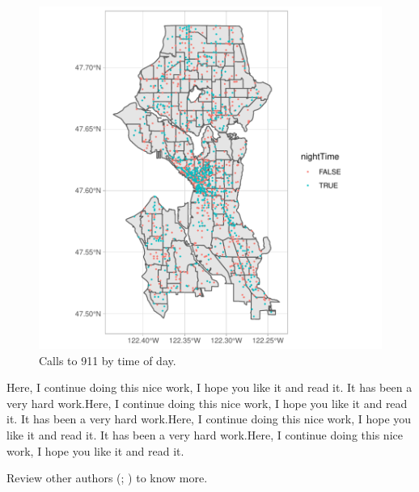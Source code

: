 \documentclass[11pt]{article}
\begin{document}
\begin{figure}[h]
\centering
\begin{adjustbox}{width=10cm,height=10cm} 
\includegraphics{WorkInR_forPrinter-theMapPlot}
\end{adjustbox}
\caption{Calls to 911 by time of day.}  
\label{theMapPlot} 
\end{figure}


Here, I continue doing this nice work, I hope you like it and read it. It has been a very hard work.Here, I continue doing this nice work, I hope you like it and read it. It has been a very hard work.Here, I continue doing this nice work, I hope you like it and read it. It has been a very hard work.Here, I continue doing this nice work, I hope you like it and read it. 

Review other authors 
(\citealp[120-160]{brunsdon_introduction_2015};
\citealp[also, see][]{camara_spatial_nodate}) to know more.







\newpage


%

\end{document}
